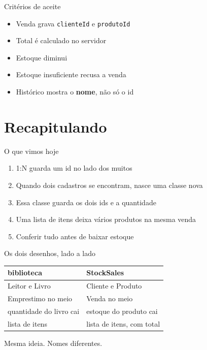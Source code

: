\documentclass[aspectratio=169,11pt]{beamer}
\begin{document}
\begin{frame}{Critérios de aceite}
  \begin{itemize}
    \item [ ] Venda grava \texttt{clienteId} e \texttt{produtoId}
    \item [ ] Total é calculado no servidor
    \item [ ] Estoque diminui
    \item [ ] Estoque insuficiente recusa a venda
    \item [ ] Histórico mostra o \textbf{nome}, não só o id
  \end{itemize}
\end{frame}

\section{Recapitulando}

\begin{frame}{O que vimos hoje}
  \begin{enumerate}
    \item 1{:}N guarda um id no lado dos muitos
    \item Quando dois cadastros se encontram, nasce uma classe nova
    \item Essa classe guarda os dois ids e a quantidade
    \item Uma lista de itens deixa vários produtos na mesma venda
    \item Conferir tudo antes de baixar estoque
  \end{enumerate}
\end{frame}

\begin{frame}{Os dois desenhos, lado a lado}
  \begin{center}
  \begin{tabular}{ll}
    \toprule
    biblioteca & StockSales \\
    \midrule
    Leitor e Livro & Cliente e Produto \\
    Emprestimo no meio & Venda no meio \\
    quantidade do livro cai & estoque do produto cai \\
    lista de itens & lista de itens, com total \\
    \bottomrule
  \end{tabular}
  \end{center}

  \vspace{0.6em}
  Mesma ideia. Nomes diferentes.
\end{frame}
\end{document}
